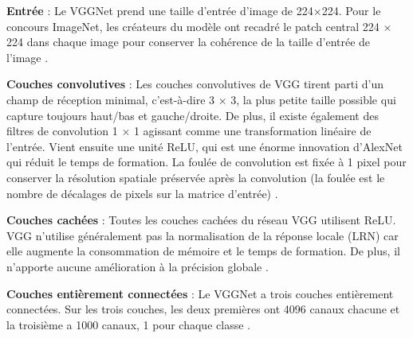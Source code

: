 	
	\begin{list}{--}{Un bref coup d'œil à l'architecture de VGG :}
		\item \textbf{Entrée} : Le VGGNet prend une taille d'entrée d'image de 224×224. Pour le concours ImageNet, les créateurs du modèle ont recadré le patch central 224 × 224 dans chaque image pour conserver la cohérence de la taille d'entrée de l'image \cite{simonyan2014very}.
		
		\item \textbf{Couches convolutives }: Les couches convolutives de VGG tirent parti d'un champ de réception minimal, c'est-à-dire 3 × 3, la plus petite taille possible qui capture toujours haut/bas et gauche/droite. De plus, il existe également des filtres de convolution 1 × 1 agissant comme une transformation linéaire de l'entrée. Vient ensuite une unité ReLU, qui est une énorme innovation d'AlexNet qui réduit le temps de formation. La foulée de convolution est fixée à 1 pixel pour conserver la résolution spatiale préservée après la convolution (la foulée est le nombre de décalages de pixels sur la matrice d'entrée) \cite{krizhevsky2012imagenet,tammina2019transfer}.
		
		\item \textbf{Couches cachées} : Toutes les couches cachées du réseau VGG utilisent ReLU. VGG n'utilise généralement pas la normalisation de la réponse locale (LRN) car elle augmente la consommation de mémoire et le temps de formation. De plus, il n'apporte aucune amélioration à la précision globale \cite{tammina2019transfer}.
		
		\item \textbf{Couches entièrement connectées} : Le VGGNet a trois couches entièrement connectées. Sur les trois couches, les deux premières ont 4096 canaux chacune et la troisième a 1000 canaux, 1 pour chaque classe \cite{tammina2019transfer}.
		
	\end{list}
	
